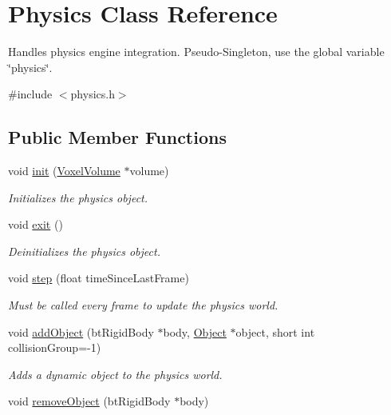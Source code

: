 \hypertarget{classPhysics}{
\section{\-Physics \-Class \-Reference}
\label{d4/d2d/classPhysics}
}


\-Handles physics engine integration. \-Pseudo-\/\-Singleton, use the global variable \char`\"{}physics\char`\"{}.  




{\ttfamily \#include $<$physics.\-h$>$}

\subsection*{\-Public \-Member \-Functions}
\begin{DoxyCompactItemize}
\item 
\hypertarget{classPhysics_a89a94b62b65b884201c0951db6334a77}{
void \hyperlink{classPhysics_a89a94b62b65b884201c0951db6334a77}{init} (\hyperlink{classVoxelVolume}{\-Voxel\-Volume} $\ast$volume)}
\label{d4/d2d/classPhysics_a89a94b62b65b884201c0951db6334a77}

\begin{DoxyCompactList}\small\item\em \-Initializes the physics object. \end{DoxyCompactList}\item 
\hypertarget{classPhysics_acc4e6b8a225f1c3f848bd8a3400c2d69}{
void \hyperlink{classPhysics_acc4e6b8a225f1c3f848bd8a3400c2d69}{exit} ()}
\label{d4/d2d/classPhysics_acc4e6b8a225f1c3f848bd8a3400c2d69}

\begin{DoxyCompactList}\small\item\em \-Deinitializes the physics object. \end{DoxyCompactList}\item 
\hypertarget{classPhysics_abf968a6c0c4273bfb26f48ed3a9d7f0c}{
void \hyperlink{classPhysics_abf968a6c0c4273bfb26f48ed3a9d7f0c}{step} (float time\-Since\-Last\-Frame)}
\label{d4/d2d/classPhysics_abf968a6c0c4273bfb26f48ed3a9d7f0c}

\begin{DoxyCompactList}\small\item\em \-Must be called every frame to update the physics world. \end{DoxyCompactList}\item 
void \hyperlink{classPhysics_a90a2e01f1d338a1fcd3ec244737fefdc}{add\-Object} (bt\-Rigid\-Body $\ast$body, \hyperlink{classObject}{\-Object} $\ast$object, short int collision\-Group=-\/1)
\begin{DoxyCompactList}\small\item\em \-Adds a dynamic object to the physics world. \end{DoxyCompactList}\item 
\hypertarget{classPhysics_a3a439e86a540e10027703190e0b6d340}{
void \hyperlink{classPhysics_a3a439e86a540e10027703190e0b6d340}{remove\-Object} (bt\-Rigid\-Body $\ast$body)}
\label{d4/d2d/classPhysics_a3a439e86a540e10027703190e0b6d340}


\end{DoxyCompactItemize}
